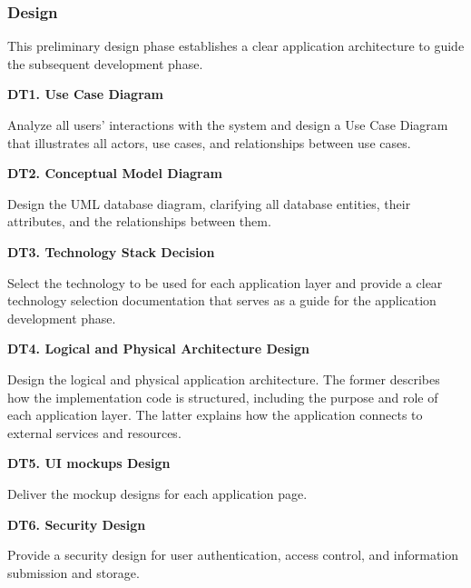 \subsubsection{Design}

This preliminary design phase establishes a clear application architecture to guide the subsequent development phase.

\textbf{DT1. Use Case Diagram}

Analyze all users’ interactions with the system and design a Use Case Diagram that illustrates all actors, use cases, and relationships between use cases.

\textbf{DT2. Conceptual Model Diagram}

Design the UML database diagram, clarifying all database entities, their attributes, and the relationships between them.

\textbf{DT3. Technology Stack Decision}

Select the technology to be used for each application layer and provide a clear technology selection documentation that serves as a guide for the application development phase.

\textbf{DT4. Logical and Physical Architecture Design}

Design the logical and physical application architecture. The former describes how the implementation code is structured, including the purpose and role of each application layer. The latter explains how the application connects to external services and resources.

\vspace{1cm}

\textbf{DT5. UI mockups Design}

Deliver the mockup designs for each application page.

\textbf{DT6. Security Design}

Provide a security design for user authentication, access control, and information submission and storage.
